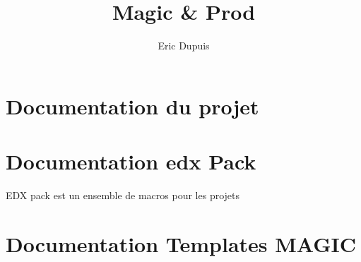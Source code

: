 


\title{Magic & Prod}
\author{Eric Dupuis}


\maketitle

\section{Documentation du projet}


\section{Documentation edx Pack}

EDX pack est un ensemble de macros pour les projets

\section{Documentation Templates MAGIC}


